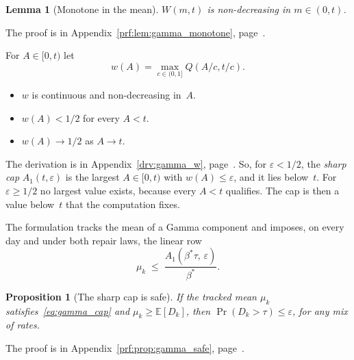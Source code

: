 \documentclass[11pt,a4paper]{article}
\theoremstyle{plain}
\newtheorem{proposition}[theorem]{Proposition}
\newtheorem{lemma}[theorem]{Lemma}
\theoremstyle{definition}
\theoremstyle{remark}
\begin{document}
\begin{lemma}[Monotone in the mean]\label{lem:gamma_monotone}
$W(m, t)$ is non-decreasing in $m \in (0, t)$.
\end{lemma}
The proof is in Appendix~\ref{prf:lem:gamma_monotone}, page~\pageref{prf:lem:gamma_monotone}.

For $A \in [0, t)$ let
\begin{equation}
  w(A) = \max_{c \in (0,1]} Q(A/c, t/c).
\end{equation}
\begin{itemize}
  \item $w$ is continuous and non-decreasing in~$A$.
  \item $w(A) < 1/2$ for every $A < t$.
  \item $w(A) \to 1/2$ as $A \to t$.
\end{itemize}
The derivation is in Appendix~\ref{drv:gamma_w}, page~\pageref{drv:gamma_w}.
So, for $\varepsilon < 1/2$, the \emph{sharp cap} $A_1(t,\varepsilon)$ is the largest $A \in [0, t)$ with $w(A) \le \varepsilon$, and it lies below~$t$.
For $\varepsilon \ge 1/2$ no largest value exists, because every $A < t$ qualifies.
The cap is then a value below~$t$ that the computation fixes.

The formulation tracks the mean of a Gamma component and imposes, on every day and under both repair laws, the linear row
\begin{equation}\label{eq:gamma_cap}
  \mu_k \;\le\; \frac{A_1(\beta^*\tau,\, \varepsilon)}{\beta^*}.
\end{equation}

\begin{proposition}[The sharp cap is safe]\label{prop:gamma_safe}
If the tracked mean $\mu_k$ satisfies~\eqref{eq:gamma_cap} and $\mu_k \ge \mathbb{E}[D_k]$, then $\Pr(D_k > \tau) \le \varepsilon$, for any mix of rates.
\end{proposition}
The proof is in Appendix~\ref{prf:prop:gamma_safe}, page~\pageref{prf:prop:gamma_safe}.
\end{document}
